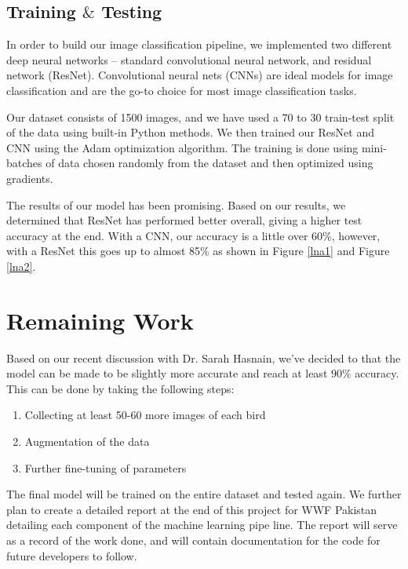 \documentclass[11pt]{article}
\begin{document}
    \subsection*{Training $\&$ Testing}
    
    In order to build our image classification pipeline, we implemented two different 
    deep neural networks -- standard convolutional neural network, and residual network (ResNet). Convolutional neural nets (CNNs) are ideal models for image classification and are the go-to choice for most image classification tasks.
    
    Our dataset consists of 1500 images, and we have used a 70 to 30 train-test split of the data using built-in Python methods. We then trained our ResNet and CNN using the Adam optimization algorithm. The training is done using mini-batches of data chosen randomly 
    from the dataset and then optimized using gradients. 

    The results of our model has been promising. Based on our results, we determined that
    ResNet has performed better overall, giving a higher test accuracy at the end. With a CNN, our accuracy is a little over 60\%, however, with a ResNet this goes up to almost 85\% as shown in Figure \ref{lna1} and Figure \ref{lna2}.
    \section*{Remaining Work}
    
    Based on our recent discussion with Dr. Sarah Hasnain, we've decided to that the model can be made to be slightly more accurate and reach at least $90\%$ accuracy. This can be done by taking the following steps:
    \begin{enumerate}
        \item Collecting at least 50-60 more images of each bird
        \item Augmentation of the data
        \item Further fine-tuning of parameters
    \end{enumerate}
    The final model will be trained on the entire dataset and tested again. We further plan to create a detailed report at the end of this project for WWF Pakistan detailing each component of the machine learning pipe line. The report will serve as a record of the work done, and will contain documentation for the code for future developers to follow. 
    
    \vspace{5 em}
\end{document}
